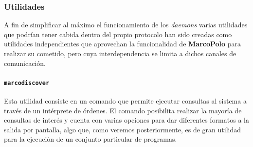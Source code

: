 






 
\subsubsection{Utilidades}

A fin de simplificar al máximo el funcionamiento de los \textit{daemons} varias utilidades que podrían tener cabida dentro del propio protocolo han sido creadas como utilidades independientes que aprovechan la funcionalidad de \textbf{MarcoPolo} para realizar su cometido, pero cuya interdependencia se limita a dichos canales de comunicación.

\paragraph{\texttt{marcodiscover}}
\label{marcodiscover}
Esta utilidad consiste en un comando que permite ejecutar consultas al sistema a través de un intérprete de órdenes. El comando posibilita realizar la mayoría de consultas de interés y cuenta con varias opciones para dar diferentes formatos a la salida por pantalla, algo que, como veremos posteriormente, es de gran utilidad para la ejecución de un conjunto particular de programas.

